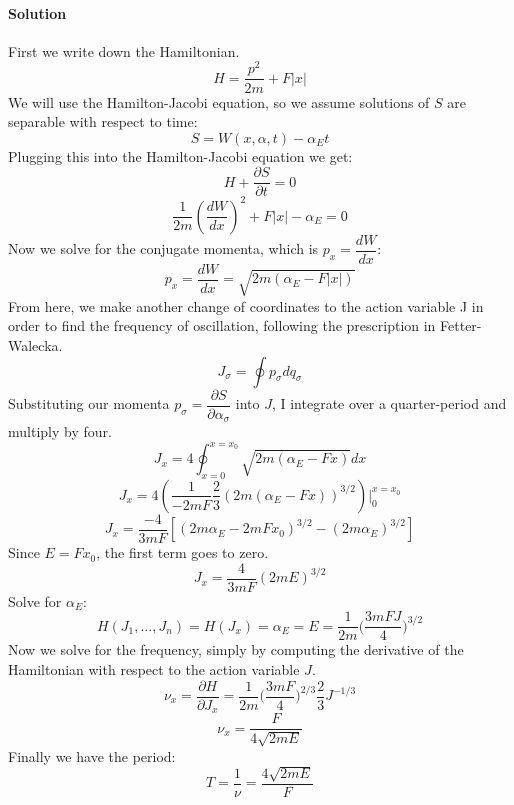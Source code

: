 \documentclass[11pt,a4paper]{report}
\begin{document}
\paragraph{Solution}
First we write down the Hamiltonian.
\begin{equation}
H=\dfrac{p^2}{2m} + F|x|
\end{equation}
We will use the Hamilton-Jacobi equation, so we assume solutions of $S$ are separable with respect to time:
\begin{equation}
S = W(x, \alpha, t) - \alpha_E t
\end{equation}
Plugging this into the Hamilton-Jacobi equation we get:
\begin{equation}
H+\dfrac{\partial S}{\partial t} = 0
\end{equation}
\begin{equation}
\dfrac{1}{2m}(\dfrac{dW}{dx})^2+F|x| -\alpha_E=0
\end{equation}
Now we solve for the conjugate momenta, which is $p_x=\dfrac{dW}{dx}$:
\begin{equation}
p_x=\dfrac{dW}{dx}=\sqrt{2m(\alpha_E-F|x|)}
\end{equation}
From here, we make another change of coordinates to the action variable J in order to find the frequency of oscillation, following the prescription in Fetter-Walecka.
\begin{equation}
J_\sigma = \oint p_\sigma dq_\sigma
\end{equation}
Substituting our momenta $p_\sigma=\dfrac{\partial S}{\partial \alpha_\sigma}$ into $J$, I integrate over a quarter-period and multiply by four.
\begin{equation}
J_x = 4\oint_{x=0}^{x=x_0} \sqrt{2m(\alpha_E-Fx)} dx
\end{equation}
\begin{equation}
J_x = 4(\dfrac{1}{-2mF}\dfrac{2}{3}(2m(\alpha_E-Fx))^{3/2})|_0^{x=x_0}
\end{equation}
\begin{equation}
J_x = \dfrac{-4}{3mF}[(2m\alpha_E-2mFx_0)^{3/2}-(2m\alpha_E)^{3/2}]
\end{equation}
Since $E = Fx_0$, the first term goes to zero.
\begin{equation}
J_x= \dfrac{4}{3mF}(2mE)^{3/2}
\end{equation}
Solve for $\alpha_E$:
\begin{equation}
H(J_1, ..., J_n)=H(J_x)=\alpha_E=E=\dfrac{1}{2m}\Big(\dfrac{3mFJ}{4}\Big)^{3/2}
\end{equation}
Now we solve for the frequency, simply by computing the derivative of the Hamiltonian with respect to the action variable $J$.
\begin{equation}
\nu_x = \dfrac{\partial H}{\partial J_x}=\dfrac{1}{2m}\Big(\dfrac{3mF}{4}\Big)^{2/3}\dfrac{2}{3}J^{-1/3}
\end{equation}
\begin{equation}
\nu_x = \dfrac{F}{4\sqrt{2mE}}
\end{equation}
Finally we have the period:
\begin{equation}
\boxed{T=\dfrac{1}{\nu}=\dfrac{4\sqrt{2mE}}{F}}
\end{equation}
\end{document}
